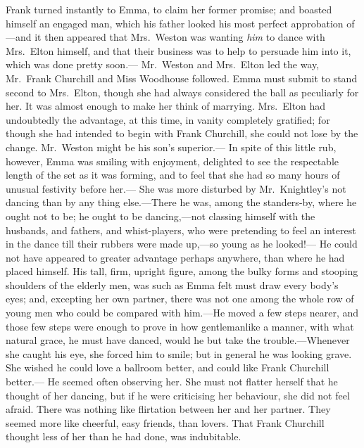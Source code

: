 Frank turned instantly to Emma, to claim her former promise;
and boasted himself an engaged man, which his father looked his most
perfect approbation of---and it then appeared that Mrs.\ Weston was
wanting \emph{him} to dance with Mrs.\ Elton himself, and that their business
was to help to persuade him into it, which was done pretty soon.---%
Mr.\ Weston and Mrs.\ Elton led the way, Mr.\ Frank Churchill and Miss
Woodhouse followed.  Emma must submit to stand second to Mrs.\ Elton,
though she had always considered the ball as peculiarly for her.
It was almost enough to make her think of marrying.  Mrs.\ Elton had
undoubtedly the advantage, at this time, in vanity completely gratified;
for though she had intended to begin with Frank Churchill, she could
not lose by the change.  Mr.\ Weston might be his son's superior.---%
In spite of this little rub, however, Emma was smiling with enjoyment,
delighted to see the respectable length of the set as it was forming,
and to feel that she had so many hours of unusual festivity before her.---%
She was more disturbed by Mr.\ Knightley's not dancing than by any
thing else.---There he was, among the standers-by, where he ought not
to be; he ought to be dancing,---not classing himself with the husbands,
and fathers, and whist-players, who were pretending to feel an interest
in the dance till their rubbers were made up,---so young as he looked!---%
He could not have appeared to greater advantage perhaps anywhere,
than where he had placed himself.  His tall, firm, upright figure,
among the bulky forms and stooping shoulders of the elderly men,
was such as Emma felt must draw every body's eyes; and, excepting her
own partner, there was not one among the whole row of young men
who could be compared with him.---He moved a few steps nearer,
and those few steps were enough to prove in how gentlemanlike
a manner, with what natural grace, he must have danced, would he
but take the trouble.---Whenever she caught his eye, she forced him
to smile; but in general he was looking grave.  She wished he could
love a ballroom better, and could like Frank Churchill better.---%
He seemed often observing her.  She must not flatter herself that he
thought of her dancing, but if he were criticising her behaviour,
she did not feel afraid.  There was nothing like flirtation between
her and her partner.  They seemed more like cheerful, easy friends,
than lovers.  That Frank Churchill thought less of her than he had done,
was indubitable.

